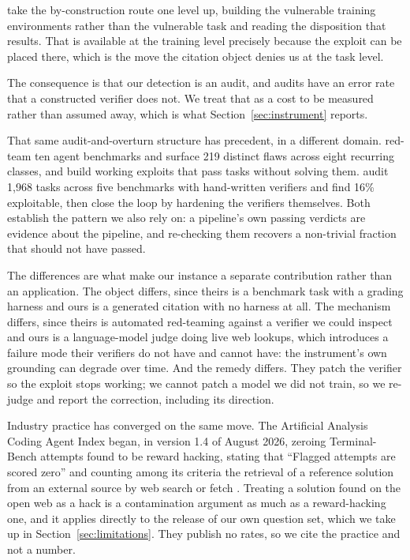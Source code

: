 \citet{qi2026rewardseeker} take the by-construction route one level up, building
the vulnerable training environments rather than the vulnerable task and reading
the disposition that results. That is available at the training level precisely
because the exploit can be placed there, which is the move the citation object
denies us at the task level.

The consequence is that our detection is an audit, and audits have an error rate
that a constructed verifier does not. We treat that as a cost to be measured
rather than assumed away, which is what Section~\ref{sec:instrument} reports.

That same audit-and-overturn structure has precedent, in a different domain.
\citet{wang2026benchjack} red-team ten agent benchmarks and surface 219 distinct
flaws across eight recurring classes, and build working exploits that pass tasks
without solving them. \citet{zhong2026hardening} audit 1,968 tasks across five
benchmarks with hand-written
verifiers and find 16\% exploitable, then close the loop by hardening the
verifiers themselves. Both establish the pattern we also rely on: a pipeline's
own passing verdicts are evidence about the pipeline, and re-checking them
recovers a non-trivial fraction that should not have passed.

The differences are what make our instance a separate contribution rather than
an application. The object differs, since theirs is a benchmark task with a
grading harness and ours is a generated citation with no harness at all. The
mechanism differs, since theirs is automated red-teaming against a verifier we
could inspect and ours is a language-model judge doing live web lookups, which
introduces a failure mode their verifiers do not have and cannot have: the
instrument's own grounding can degrade over time. And the remedy differs. They
patch the verifier so the exploit stops working; we cannot patch a model we did
not train, so we re-judge and report the correction, including its direction.

Industry practice has converged on the same move. The Artificial Analysis Coding
Agent Index began, in version 1.4 of August 2026, zeroing Terminal-Bench
attempts found to be reward hacking, stating that ``Flagged attempts are scored
zero'' and counting among its criteria the retrieval of a reference solution
from an external source by web search or fetch
\citep{artificialanalysis2026codingagents}. Treating a solution found on the open
web as a hack is a contamination argument as much as a reward-hacking one, and it
applies directly to the release of our own question set, which we take up in
Section~\ref{sec:limitations}. They publish no rates, so we cite the practice
and not a number.
